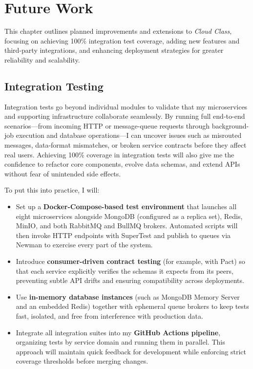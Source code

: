 \chapter{Future Work}

This chapter outlines planned improvements and extensions to \emph{Cloud Class}, focusing on achieving 100\% integration test coverage, adding new features and third-party integrations, and enhancing deployment strategies for greater reliability and scalability.



\section{Integration Testing}

Integration tests go beyond individual modules to validate that my microservices and supporting infrastructure collaborate seamlessly. By running full end-to-end scenarios—from incoming HTTP or message-queue requests through background-job execution and database operations—I can uncover issues such as misrouted messages, data-format mismatches, or broken service contracts before they affect real users. Achieving 100\% coverage in integration tests will also give me the confidence to refactor core components, evolve data schemas, and extend APIs without fear of unintended side effects.

To put this into practice, I will:

\begin{itemize}
  \item Set up a \textbf{Docker-Compose-based test environment} that launches all eight microservices alongside MongoDB (configured as a replica set), Redis, MinIO, and both RabbitMQ and BullMQ brokers.  Automated scripts will then invoke HTTP endpoints with SuperTest and publish to queues via Newman to exercise every part of the system.
  \item Introduce \textbf{consumer-driven contract testing} (for example, with Pact) so that each service explicitly verifies the schemas it expects from its peers, preventing subtle API drifts and ensuring compatibility across deployments.
  \item Use \textbf{in-memory database instances} (such as MongoDB Memory Server and an embedded Redis) together with ephemeral queue brokers to keep tests fast, isolated, and free from interference with production data.
  \item Integrate all integration suites into my \textbf{GitHub Actions pipeline}, organizing tests by service domain and running them in parallel.  This approach will maintain quick feedback for development while enforcing strict coverage thresholds before merging changes.
\end{itemize}



